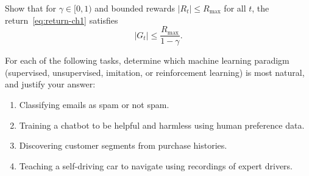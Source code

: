 \begin{exercise}
\label{ex:discount}
Show that for $\gamma\in[0,1)$ and bounded rewards $|R_t|\le R_{\max}$ for all $t$, the return~\eqref{eq:return-ch1} satisfies
\[
|G_t| \le \frac{R_{\max}}{1-\gamma}.
\]
\end{exercise}

\begin{exercise}
\label{ex:paradigm-compare}
For each of the following tasks, determine which machine learning paradigm (supervised, unsupervised, imitation, or reinforcement learning) is most natural, and justify your answer:
\begin{enumerate}[label=(\alph*)]
\item Classifying emails as spam or not spam.
\item Training a chatbot to be helpful and harmless using human preference data.
\item Discovering customer segments from purchase histories.
\item Teaching a self-driving car to navigate using recordings of expert drivers.
\end{enumerate}
\end{exercise}
